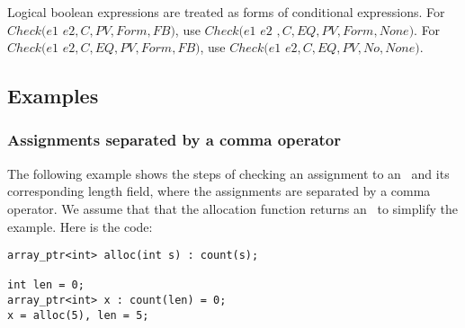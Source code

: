 Logical boolean expressions are treated as forms of conditional expressions.
For  $Check(e1$ \code{&&} $ e2, C, PV, Form, FB)$, use
$Check(e1$  $e2$ $, C, EQ, PV, Form, None)$.
For $Check(e1$ \code{ \|\| } $ e2, C, EQ, PV, Form, FB)$,  use
$Check(e1 $  $e2, C, EQ, PV, No, None)$.

\subsection{Examples}

\subsubsection{Assignments separated by a comma operator}

The following example shows the steps of checking an assignment to an \arrayptr\ and its corresponding
length field, where the assignments are separated by a comma operator.  We assume that that the allocation
function returns an \arrayptrint\ to simplify the example.  Here is the code:
\begin{lstlisting}
array_ptr<int> alloc(int s) : count(s);

int len = 0;
array_ptr<int> x : count(len) = 0;
x = alloc(5), len = 5;
\end{lstlisting}

